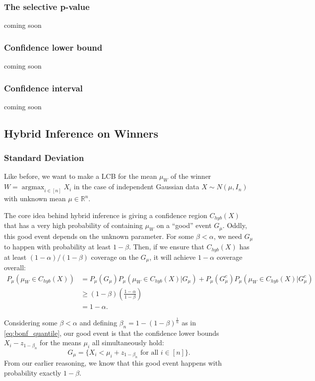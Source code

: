 \documentclass{article}
\DeclareMathOperator*{\argmax}{argmax}
\newcommand{\R}{\mathbb{R}}
\begin{document}
\begin{appendix}
\subsubsection{The selective p-value }
coming soon

\subsubsection{Confidence lower bound}
coming soon

\subsubsection{Confidence interval}
coming soon

\subsection{Hybrid Inference on Winners}
\label{sec:hybrid_appdx}

\subsubsection{Standard Deviation}

Like before, we want to make a LCB for the mean $\mu_{W}$ of the winner $W = \argmax_{i \in [n]} X_i$ in the case of independent Gaussian data $X \sim N(\mu, I_n)$ with unknown mean $\mu \in \R^n$. 

The core idea behind hybrid inference is giving a confidence region $C_{hyb}(X)$ that has a very high probability of containing $\mu_W$ on a ``good'' event $G_{\mu}$. Oddly, this good event depends on the unknown parameter. For some $\beta < \alpha$, we need $G_{\mu}$ to happen with probability at least $1-\beta$. Then, if we ensure that $C_{hyb}(X)$ has at least $(1-\alpha)/(1-\beta)$ coverage on the $G_{\mu}$, it will achieve $1-\alpha$ coverage overall:
\begin{align*}
       P_{\mu}(\mu_{W} \in C_{hyb}(X)) &= P_{\mu}(G_{\mu})P_{\mu}(\mu_{W} \in C_{hyb}(X) | G_{\mu}) + P_{\mu}(G_{\mu}^c)P_{\mu}(\mu_{W} \in C_{hyb}(X) | G_{\mu}^c)\\
       &\geq (1-\beta)\left(\frac{1-\alpha}{1-\beta} \right)\\
       &=1-\alpha.
\end{align*}

Considering some $\beta < \alpha$ and defining $\beta_n = 1 - (1-\beta)^{\frac{1}{n}}$ as in \eqref{eq:bonf_quantile}, our good event is that the confidence lower bounds $X_i -  z_{1-\beta_n}$ for the means $\mu_i$ all simultaneously hold:
\begin{equation*}
    G_{\mu} = \{X_i < \mu_i + z_{1-\beta_n} \text{ for all } i \in [n] \}.
\end{equation*}
From our earlier reasoning, we know that this good event happens with probability exactly $1-\beta$. 


\end{appendix}
\end{document}
